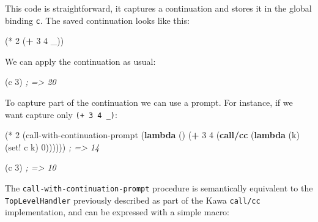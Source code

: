 \documentclass[12pt,a4paper,oneside,openright]{book}
\newenvironment{Shaded}{\begin{snugshade}}{\end{snugshade}}
\newcommand{\KeywordTok}[1]{\textcolor[rgb]{0.13,0.29,0.53}{\textbf{{#1}}}}
\newcommand{\DecValTok}[1]{\textcolor[rgb]{0.00,0.00,0.81}{{#1}}}
\newcommand{\CommentTok}[1]{\textcolor[rgb]{0.56,0.35,0.01}{\textit{{#1}}}}
\newcommand{\FunctionTok}[1]{\textcolor[rgb]{0.00,0.00,0.00}{{#1}}}
\newcommand{\NormalTok}[1]{{#1}}
\begin{document}
This code is straightforward, it captures a continuation and stores it
in the global binding \texttt{c}. The saved continuation looks like
this:

\begin{Shaded}
\begin{Highlighting}[]
    \NormalTok{(* }\DecValTok{2} \NormalTok{(}\KeywordTok{+} \DecValTok{3} \DecValTok{4} \NormalTok{_))}
\end{Highlighting}
\end{Shaded}

We can apply the continuation as usual:

\begin{Shaded}
\begin{Highlighting}[]
    \NormalTok{(c }\DecValTok{3}\NormalTok{) }\CommentTok{; => 20}
\end{Highlighting}
\end{Shaded}

To capture part of the continuation we can use a prompt. For instance,
if we want capture only \texttt{(+\ 3\ 4\ \_)}:

\begin{Shaded}
\begin{Highlighting}[]
    \NormalTok{(* }\DecValTok{2}
      \NormalTok{(call-with-continuation-prompt}
        \NormalTok{(}\KeywordTok{lambda} \NormalTok{()}
          \NormalTok{(}\KeywordTok{+} \DecValTok{3} \DecValTok{4}
            \NormalTok{(}\KeywordTok{call/cc}
              \NormalTok{(}\KeywordTok{lambda} \NormalTok{(k)}
                \NormalTok{(set! c k)}
                \DecValTok{0}\NormalTok{)))))) }\CommentTok{; => 14}
\end{Highlighting}
\end{Shaded}

\begin{Shaded}
\begin{Highlighting}[]
    \NormalTok{(c }\DecValTok{3}\NormalTok{) }\CommentTok{; => 10}
\end{Highlighting}
\end{Shaded}

The \texttt{call-with-continuation-prompt} procedure is semantically
equivalent to the \texttt{TopLevelHandler} previously described as part
of the Kawa \texttt{call/cc} implementation, and can be expressed with a
simple macro:

\begin{Shaded}
\end{Shaded}
\end{document}
